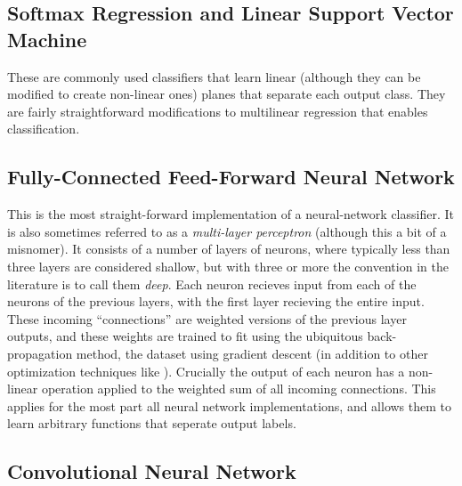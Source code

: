 \documentclass[utf8]{frontiersSCNS} %
\begin{document}
\subsection{Softmax Regression and Linear Support Vector Machine}

These are commonly used classifiers that learn linear (although they can be modified to create non-linear ones) planes that separate each output class. They are fairly straightforward modifications to multilinear regression that enables classification. %

\subsection{Fully-Connected Feed-Forward Neural Network}

This is the most straight-forward implementation of a neural-network classifier. It is also sometimes referred to as a \emph{multi-layer perceptron} (although this a bit of a misnomer). It consists of a number of layers of neurons, where typically less than three layers are considered shallow, but with three or more the convention in the literature is to call them \textit{deep}. Each neuron recieves input from each of the neurons of the previous layers, with the first layer recieving the entire input. These incoming ``connections'' are weighted versions of the previous layer outputs, and these weights are trained to fit using the ubiquitous back-propagation method, \cite{Lecunn_phd, GoodfellowTextbook} the dataset using gradient descent (in addition to other optimization techniques like \cite{adam, rmsprop, etc}). Crucially the output of each neuron has a non-linear operation applied to the weighted sum of all incoming connections. This applies for the most part all neural network implementations, and allows them to learn arbitrary functions that seperate output labels.

\subsection{Convolutional Neural Network}

\end{document}
